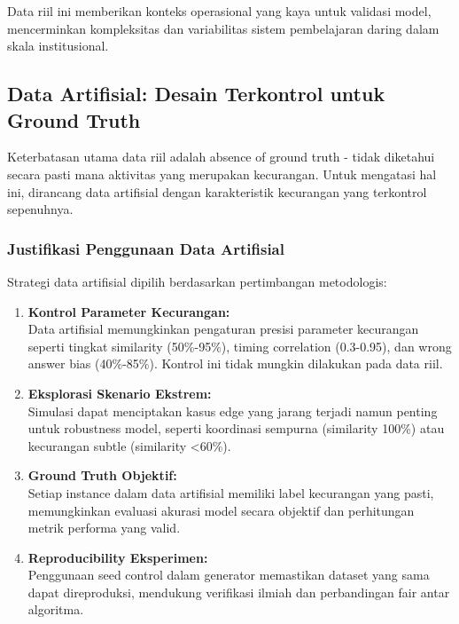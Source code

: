 Data riil ini memberikan konteks operasional yang kaya untuk validasi model, mencerminkan kompleksitas dan variabilitas sistem pembelajaran daring dalam skala institusional.

\subsection{Data Artifisial: Desain Terkontrol untuk Ground Truth}
\label{sec:dataArtifisial}

Keterbatasan utama data riil adalah absence of ground truth - tidak diketahui secara pasti mana aktivitas yang merupakan kecurangan. Untuk mengatasi hal ini, dirancang data artifisial dengan karakteristik kecurangan yang terkontrol sepenuhnya.

\subsubsection{Justifikasi Penggunaan Data Artifisial}
\label{sec:justifikasiDataArtifisial}

Strategi data artifisial dipilih berdasarkan pertimbangan metodologis:

\begin{enumerate}
    \item \textbf{Kontrol Parameter Kecurangan:} \\
    Data artifisial memungkinkan pengaturan presisi parameter kecurangan seperti tingkat similarity (50\%-95\%), timing correlation (0.3-0.95), dan wrong answer bias (40\%-85\%). Kontrol ini tidak mungkin dilakukan pada data riil.
    
    \item \textbf{Eksplorasi Skenario Ekstrem:} \\
    Simulasi dapat menciptakan kasus edge yang jarang terjadi namun penting untuk robustness model, seperti koordinasi sempurna (similarity 100\%) atau kecurangan subtle (similarity <60\%).
    
    \item \textbf{Ground Truth Objektif:} \\
    Setiap instance dalam data artifisial memiliki label kecurangan yang pasti, memungkinkan evaluasi akurasi model secara objektif dan perhitungan metrik performa yang valid.
    
    \item \textbf{Reproducibility Eksperimen:} \\
    Penggunaan seed control dalam generator memastikan dataset yang sama dapat direproduksi, mendukung verifikasi ilmiah dan perbandingan fair antar algoritma.
\end{enumerate}


